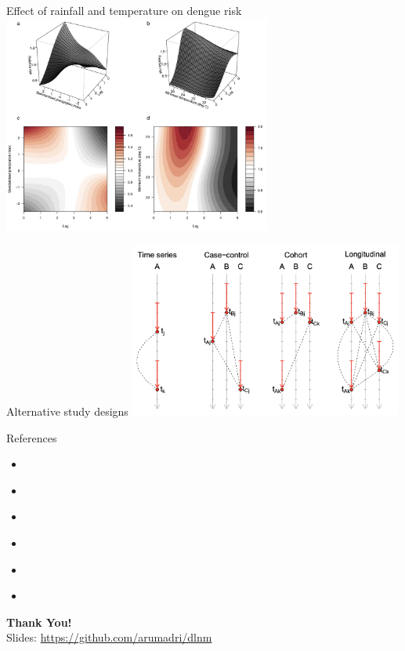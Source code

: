 \documentclass[english]{beamer}
\newcommand{\alertblue}[1]{{\color{blue}#1}}
\begin{document}
\begin{frame}{Effect of rainfall and temperature on dengue risk}
\centering
    \includegraphics[width=8.8cm,keepaspectratio]{images/dlnm_example_2.png}    
\end{frame}
\begin{frame}{Alternative study designs}
    \centering
    \includegraphics[width=9cm,keepaspectratio]{images/use_cases.png}
\end{frame}
\begin{frame}{References}
    \begin{itemize}
        \item \cite{gasparrini_distributed_2010}
        \item \cite{gasparrini_distributed_2011}
        \item\cite{gareth_james__daniela_witten__trevor_hastie_introduction_nodate}
        \item \cite{gasparrini_attributable_2014}
        \item \cite{asenmacher_exposure-lag-response_2016}
        \item \cite{lowe_nonlinear_2018}
    \end{itemize}
    \vspace{1em}
    \centering
    \textbf{\large Thank You!} \\
    \vspace{1em}
    Slides: \href{https://github.com/arumadri/dlnm}{\alertblue{https://github.com/arumadri/dlnm}}
\end{frame}
\end{document}
